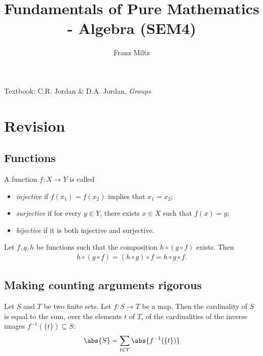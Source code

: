\documentclass{article}
\begin{document}
\mkfpmthms
\title{Fundamentals of Pure Mathematics - Algebra (SEM4)}
\author{Franz Miltz}
\maketitle
\noindent Textbook: C.R. Jordan \& D.A. Jordan, \emph{Groups}
\tableofcontents
\pagebreak

\setcounter{section}{-1}


\section{Revision}


\subsection{Functions}

\begin{definition}
    A function $f:X\to Y$ is called
    \begin{itemize}
        \item \emph{injective} if $f(x_1)=f(x_2)$ implies that $x_1=x_2$;
        \item \emph{surjective} if for every $y\in Y$, there exists $x\in X$ such that $f(x)=y$;
        \item \emph{bijective} if it is both injective and surjective.
    \end{itemize}
\end{definition}

\begin{lemma}
    Let $f,g,h$ be functions such that the composition $h \circ (g \circ f)$ exists. Then
    \begin{align*}
        h \circ (g \circ f) = (h \circ g) \circ f = h \circ g \circ f.
    \end{align*}
\end{lemma}

\subsection{Making counting arguments rigorous}

\begin{theorem}
    Let $S$ and $T$ be two finite sets. Let $f:S\to T$ be a map.
    Then the cardinality of $S$ is equal to the sum, over the elements
    $t$ of $T$, of the cardinalities of the inverse images $f^{-1}(\{t\})\subseteq S$:
    \begin{align*}
        \abs{S} = \sum_{t\in T}\abs{f^{-1}(\{t\})}
    \end{align*}
\end{theorem}
\end{document}

